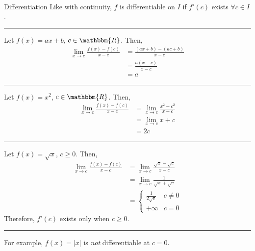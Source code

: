 \documentclass[10pt]{extarticle}
\newcommand{\R}{\mathbbm{R}}
\begin{document}
\begin{problem}{Differentiation}
    Like with continuity, $f$ is differentiable on $I$ if $f'(c)$ exists $\forall c\in I$.\\
    \vspace{4pt}
    \rule{\textwidth}{0.4pt}
    \vspace{4pt}
    Let $f(x) = ax+b$, $c\in\R$. Then,
    \begin{align*}
      \lim_{x\rightarrow c} \frac{f(x) - f(c)}{x-c} &= \frac{(ax+b) - (ac+b)}{x-c}\\
                              &= \frac{a(x-c)}{x-c}\\
                              &= a
    \end{align*}
    \vspace{4pt}
    \rule{\textwidth}{0.4pt}
    \vspace{4pt}
    Let $f(x) = x^2$, $c\in\R$. Then,
    \begin{align*}
      \lim_{x\rightarrow c}\frac{f(x) - f(c)}{x-c} &= \lim_{x\rightarrow c}\frac{x^2 - c^2}{x-c}\\
                                                   &= \lim_{x\rightarrow c} x+c\\
                                                   &= 2c
    \end{align*}
    \vspace{4pt}
    \rule{\textwidth}{0.4pt}
    \vspace{4pt}
    Let $f(x) = \sqrt{x}$, $c \geq 0$. Then,
    \begin{align*}
      \lim_{x\rightarrow c} \frac{f(x) - f(c)}{x-c} &= \lim_{x\rightarrow c}\frac{\sqrt{x} - \sqrt{c}}{x-c}\\
                                                    &= \lim_{x\rightarrow c}\frac{1}{\sqrt{x} + \sqrt{c}}\\
                                                    &= \begin{cases}
                                                      \frac{1}{2\sqrt{c}} & c \neq 0\\
                                                      +\infty & c = 0
                                                    \end{cases}
    \end{align*}
    Therefore, $f'(c)$ exists only when $c\geq 0$.\\
    \vspace{4pt}
    \rule{\textwidth}{0.4pt}
    \vspace{4pt}
    For example, $f(x) = |x|$ is \textit{not} differentiable at $c=0$.

\end{problem}
\end{document}
